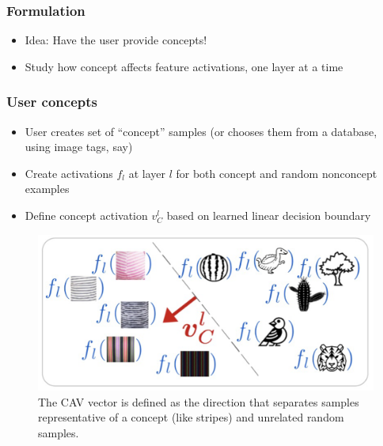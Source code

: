 \documentclass[10pt,mathserif]{beamer}
\begin{document}
\begin{frame}
  \frametitle{Formulation}
  \begin{itemize}
  \item Idea: Have the user provide concepts!
  \item Study how concept affects feature activations, one layer at a time
  \end{itemize} 
\end{frame}

\begin{frame}
  \frametitle{User concepts}
  \begin{itemize}
  \item User creates set of ``concept'' samples (or chooses them from a
    database, using image tags, say)
  \item Create activations $f_{l}$ at layer $l$ for both concept and random
    nonconcept examples
  \item Define concept activation $v_{C}^l$ based on learned linear decision
    boundary
  \end{itemize} 
  \begin{figure}[ht]
    \centering
    \includegraphics[width=0.6\paperwidth]{figure/cav_space}
    \caption{The CAV vector is defined as the direction that separates samples
      representative of a concept (like stripes) and unrelated random samples.
      \label{fig:cav_space} }
  \end{figure}
\end{frame}
\end{document}
